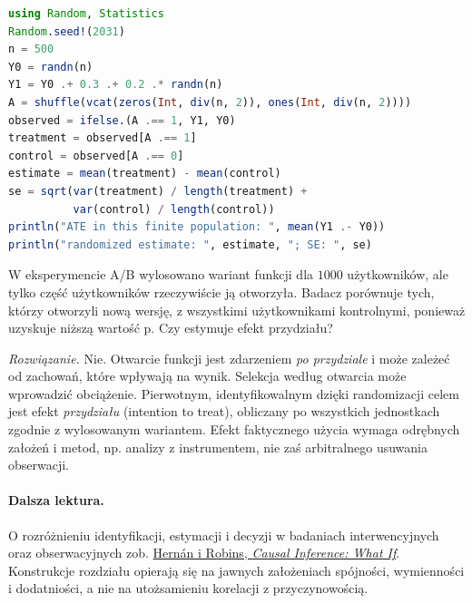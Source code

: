 \begin{lstlisting}[language=Julia,caption={Kompletny program: estymator różnicy średnich w doświadczeniu randomizowanym (Julia, Random, Statistics).}]
using Random, Statistics
Random.seed!(2031)
n = 500
Y0 = randn(n)
Y1 = Y0 .+ 0.3 .+ 0.2 .* randn(n)
A = shuffle(vcat(zeros(Int, div(n, 2)), ones(Int, div(n, 2))))
observed = ifelse.(A .== 1, Y1, Y0)
treatment = observed[A .== 1]
control = observed[A .== 0]
estimate = mean(treatment) - mean(control)
se = sqrt(var(treatment) / length(treatment) +
          var(control) / length(control))
println("ATE in this finite population: ", mean(Y1 .- Y0))
println("randomized estimate: ", estimate, "; SE: ", se)
\end{lstlisting}

\begin{zadanie}
W eksperymencie A/B wylosowano wariant funkcji dla $1000$ użytkowników, ale tylko część użytkowników rzeczywiście ją otworzyła. Badacz porównuje tych, którzy otworzyli nową wersję, z wszystkimi użytkownikami kontrolnymi, ponieważ uzyskuje niższą wartość p. Czy estymuje efekt przydziału?\par
\emph{Rozwiązanie.} Nie. Otwarcie funkcji jest zdarzeniem \emph{po przydziale} i może zależeć od zachowań, które wpływają na wynik. Selekcja według otwarcia może wprowadzić obciążenie. Pierwotnym, identyfikowalnym dzięki randomizacji celem jest efekt \emph{przydziału} (intention to treat), obliczany po wszystkich jednostkach zgodnie z wylosowanym wariantem. Efekt faktycznego użycia wymaga odrębnych założeń i metod, np. analizy z instrumentem, nie zaś arbitralnego usuwania obserwacji.
\end{zadanie}

\paragraph{Dalsza lektura.}
O rozróżnieniu identyfikacji, estymacji i decyzji w badaniach interwencyjnych oraz obserwacyjnych zob. \href{https://www.hsph.harvard.edu/miguel-hernan/causal-inference-book/}{Hernán i Robins, \emph{Causal Inference: What If}}. Konstrukcje rozdziału opierają się na jawnych założeniach spójności, wymienności i dodatniości, a nie na utożsamieniu korelacji z przyczynowością.



